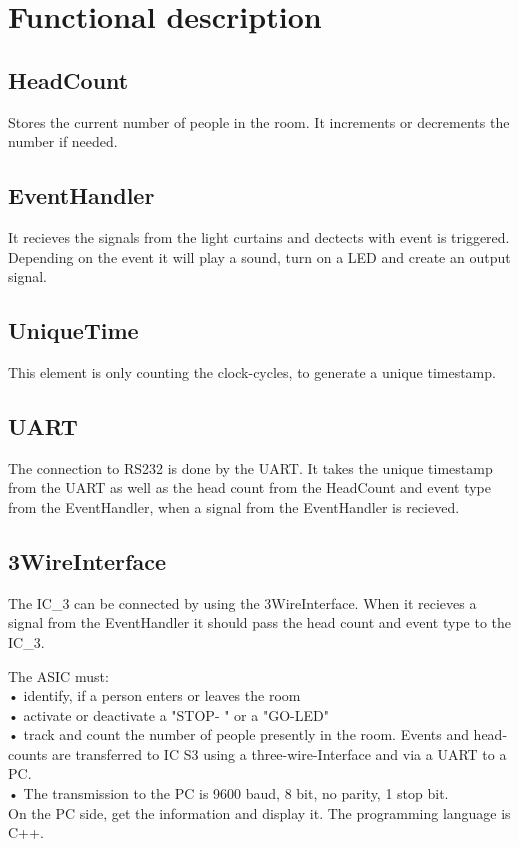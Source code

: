 \documentclass[12pt,a4 paper] {report}
\begin{document}
\chapter{Functional description}
\section*{HeadCount}
Stores the current number of people in the room. It increments or decrements the number if needed.
\section*{EventHandler}
It recieves the signals from the light curtains and dectects with event is triggered. Depending on the event it will play a sound, turn on a LED and create an output signal.
\section*{UniqueTime}
This element is only counting the clock-cycles, to generate a unique timestamp. \newpage
\section*{UART}
The connection to RS232 is done by the UART. It takes the unique timestamp from the UART as well as the head count from the HeadCount and event type from the EventHandler, when a signal from the EventHandler is recieved.
\section*{3WireInterface}
The IC\_3 can be connected by using the 3WireInterface. When it recieves a signal from the EventHandler it should pass the head count and event type to the IC\_3.


The ASIC must:\\
• identify, if a person enters or leaves the room\\
• activate or deactivate a "STOP- " or a "GO-LED"\\
• track and count the number of people presently in the room. Events and head-counts are transferred to IC S3 using a three-wire-Interface and via a UART to a PC. \\
• The transmission to the PC is 9600 baud, 8 bit, no parity, 1 stop bit. \\
On the PC side, get the information and display it. The programming language is
C++.\\
\end{document}
